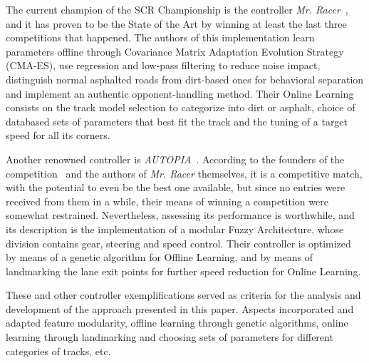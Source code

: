 	The current champion of the SCR Championship is the controller \emph{Mr. Racer}~\cite{MrRacer}, and it has
	proven to be the State of the Art by winning at least the last three competitions that happened. The authors
	of this implementation learn parameters offline through Covariance Matrix Adaptation Evolution Strategy
	(CMA-ES), use regression and low-pass filtering to reduce noise impact, distinguish normal asphalted roads
	from dirt-based ones for behavioral separation and implement an authentic opponent-handling method. Their
	Online Learning consists on the track model selection to categorize into dirt or asphalt, choice of databased
	sets of parameters that best fit the track and the tuning of a target speed for all its corners.
	
	Another renowned controller is \emph{AUTOPIA}~\cite{AUTOPIA}. According to the founders of the
	competition~\cite{SCRC} and the authors of \emph{Mr. Racer} themselves, it is a competitive match, with the
	potential to even be the best one available, but since no entries were received from them in a while, their
	means of winning a competition were somewhat restrained. Nevertheless, assessing its performance is
	worthwhile, and its description is the implementation of a modular Fuzzy Architecture, whose division contains
	gear, steering and speed control. Their controller is optimized by means of a genetic algorithm for Offline
	Learning, and by means of landmarking the lane exit points for further speed reduction for Online Learning.
	
	These and other controller exemplifications served as criteria for the analysis and development of the
	approach presented in this paper. Aspects incorporated and adapted feature modularity, offline learning
	through genetic algorithms, online learning through landmarking and choosing sets of parameters for different
	categories of tracks, etc. 

